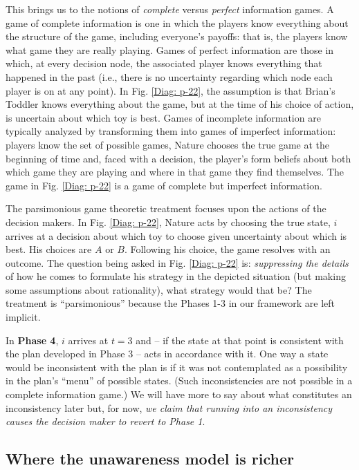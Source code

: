 \documentclass[
11pt,
titlepage,
reqno,
]{article}%
\theoremstyle{definition}
\begin{document}
This brings us to the notions of \textit{complete} versus \textit{perfect} information games. A game of complete information is one in which the players know everything about the structure of the game, including everyone's payoffs: that is, the players know what game they are really playing. Games of perfect information are those in which, at every decision node, the associated player knows everything that happened in the past (i.e., there is no uncertainty regarding which node each player is on at any point). In Fig.  \ref{Diag: p-22}, the assumption is that Brian's Toddler knows everything about the game, but at the time of his choice of action, is uncertain about which toy is best. Games of incomplete information are typically analyzed by transforming them into games of imperfect information: players know the set of possible games, Nature chooses the true game at the beginning of time and, faced with a decision,  the player's form beliefs about both which game they are playing and where in that game they find themselves. The game in Fig.  \ref{Diag: p-22} is a game of complete but imperfect information. 

The parsimonious game theoretic treatment focuses upon the actions of the decision makers. In Fig. \ref{Diag: p-22}, Nature acts by choosing the true state, $i$ arrives at a decision about which toy to choose given  uncertainty about which is  best. His choices are $A$ or $B$. Following his choice, the game resolves with an outcome. The question being asked in Fig. \ref{Diag: p-22} is: \textit{suppressing the details} of how he comes to formulate  his strategy in the depicted situation (but making some assumptions about rationality), what strategy would that be? The treatment is ``parsimonious'' because the Phases 1-3 in our framework are left implicit.


In \textbf{Phase 4}, $i$ arrives at $t=3$ and -- if the state at that point is consistent with the plan developed in Phase 3 -- acts in accordance with it. One way a state would be inconsistent with the plan is if it was not contemplated as a possibility in the plan's ``menu'' of possible states. (Such inconsistencies are not possible in a complete information game.) We will have more to say about what constitutes an inconsistency later but, for now, \textit{we claim that running into an inconsistency causes the decision maker to revert to Phase 1}.  

\subsection{Where the unawareness model is richer}
\end{document}
